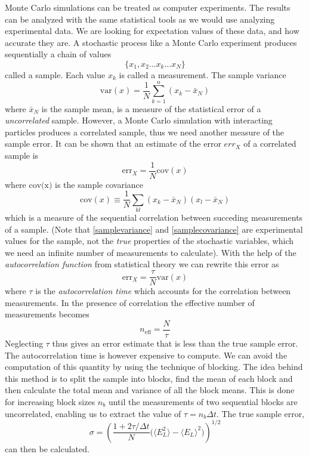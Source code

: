 \documentclass[english, a4paper]{article}
\begin{document}
Monte Carlo simulations can be treated as computer experiments. The results can be analyzed with the same
statistical tools as we would use analyzing experimental data. We are looking for expectation values
of these data, and how accurate they are.
A stochastic process like a Monte Carlo experiment produces sequentially a chain of values
\begin{equation}
 \{x_1, x_2 \dots x_k \dots x_N \}
\end{equation}
called a sample. Each value $x_k$ is called a measurement. The sample variance
\begin{equation}
 \textrm{var}(x) = \frac{1}{N} \sum_{k=1}^n (x_k - \bar{x}_N)
 \label{samplevariance}
\end{equation}
where $\bar{x}_N$ is the sample mean, is a measure of the statistical error of a \textit{uncorrelated} sample.
However, a Monte Carlo simulation with interacting particles produces a correlated sample, 
thus we need another measure of the sample error.
It can be shown that an estimate of the error $err_X$ 
of a correlated sample is
\begin{equation}
 \textrm{err}_X = \frac{1}{N} \textrm{cov}(x)
\end{equation}
where $\textrm{cov(x)}$  is the sample covariance
\begin{equation}
 \textrm{cov}(x) \equiv \frac{1}{N} \sum_{kl} (x_k - \bar{x}_N) (x_l - \bar{x}_N)
 \label{samplecovariance}
\end{equation}
which is a measure of the sequential correlation between succeding measurements of a sample.
(Note that \eqref{samplevariance} and \eqref{samplecovariance}
are experimental values for the sample, not the \textit{true} properties of
the stochastic variables, which we need an infinite number of measurements to calculate).
With the help of the \textit{autocorrelation function} from statistical theory we can rewrite
this error as
\begin{equation}
 \textrm{err}_X = \frac{\tau}{N} \textrm{var}(x)
\end{equation}
where $\tau$ is the \textit{autocorrelation time} which accounts
for the correlation between measurements. In the presence of
correlation the effective number of measurements becomes
\begin{equation}
 n_{\textrm{eff}} = \frac{N}{\tau}
\end{equation}
Neglecting $\tau$ thus gives an error estimate that is less than the true sample error. 
The autocorrelation time is however expensive to compute. We can avoid the computation of this quantity by using
the technique of blocking. The idea behind this method is to split the sample into blocks, find the mean of each block
and then calculate the total mean and variance of all the block means.
This is done for increasing block sizes $n_b$ until the measurements of two sequential blocks are uncorrelated,
enabling us to extract the value of $\tau = n_b\Delta t$. The true sample error,
\begin{equation}
 \sigma = \left( \frac{1 + 2\tau / \Delta t}{N} \bigr( \langle E_L^2\rangle - \langle E_L \rangle^2\bigr) \right)^{1/2}
 \label{trueSampleError}
\end{equation}
can then be calculated. \\
\end{document}
